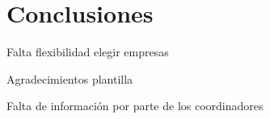 \chapter{Conclusiones}

Falta flexibilidad elegir empresas

Agradecimientos plantilla

Falta de información por parte de los coordinadores